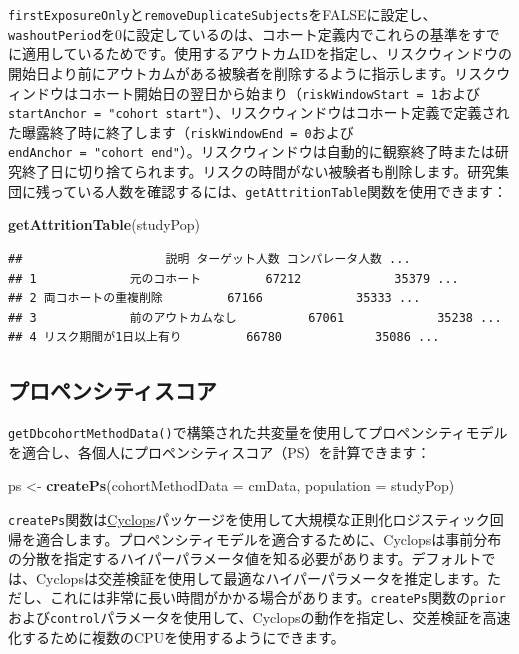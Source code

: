 \documentclass[
  11pt]{book}
\newenvironment{Shaded}{\begin{snugshade}}{\end{snugshade}}
\newcommand{\AttributeTok}[1]{\textcolor[rgb]{0.13,0.29,0.53}{#1}}
\newcommand{\FunctionTok}[1]{\textcolor[rgb]{0.13,0.29,0.53}{\textbf{#1}}}
\newcommand{\NormalTok}[1]{#1}
\newcommand{\OtherTok}[1]{\textcolor[rgb]{0.56,0.35,0.01}{#1}}
\theoremstyle{definition}
\theoremstyle{definition}
\theoremstyle{definition}
\theoremstyle{definition}
\theoremstyle{remark}
\begin{document}
\texttt{firstExposureOnly}と\texttt{removeDuplicateSubjects}をFALSEに設定し、\texttt{washoutPeriod}を0に設定しているのは、コホート定義内でこれらの基準をすでに適用しているためです。使用するアウトカムIDを指定し、リスクウィンドウの開始日より前にアウトカムがある被験者を削除するように指示します。リスクウィンドウはコホート開始日の翌日から始まり（\texttt{riskWindowStart\ =\ 1}および\texttt{startAnchor\ =\ "cohort\ start"}）、リスクウィンドウはコホート定義で定義された曝露終了時に終了します（\texttt{riskWindowEnd\ =\ 0}および\texttt{endAnchor\ =\ "cohort\ end"}）。リスクウィンドウは自動的に観察終了時または研究終了日に切り捨てられます。リスクの時間がない被験者も削除します。研究集団に残っている人数を確認するには、\texttt{getAttritionTable}関数を使用できます：

\begin{Shaded}
\begin{Highlighting}[]
\FunctionTok{getAttritionTable}\NormalTok{(studyPop)}
\end{Highlighting}
\end{Shaded}

\begin{verbatim}
##                    説明 ターゲット人数 コンパレータ人数 ...
## 1             元のコホート         67212             35379 ...
## 2 両コホートの重複削除         67166             35333 ...
## 3             前のアウトカムなし          67061             35238 ...
## 4 リスク期間が1日以上有り         66780             35086 ...
\end{verbatim}

\subsection{プロペンシティスコア}\label{ux30d7ux30edux30daux30f3ux30b7ux30c6ux30a3ux30b9ux30b3ux30a2}

\texttt{getDbcohortMethodData()}で構築された共変量を使用してプロペンシティモデルを適合し、各個人にプロペンシティスコア（PS）を計算できます：

\begin{Shaded}
\begin{Highlighting}[]
\NormalTok{ps }\OtherTok{\textless{}{-}} \FunctionTok{createPs}\NormalTok{(}\AttributeTok{cohortMethodData =}\NormalTok{ cmData, }\AttributeTok{population =}\NormalTok{ studyPop)}
\end{Highlighting}
\end{Shaded}

\texttt{createPs}関数は\href{https://ohdsi.github.io/Cyclops/}{Cyclops}パッケージを使用して大規模な正則化ロジスティック回帰を適合します。プロペンシティモデルを適合するために、Cyclopsは事前分布の分散を指定するハイパーパラメータ値を知る必要があります。デフォルトでは、Cyclopsは交差検証を使用して最適なハイパーパラメータを推定します。ただし、これには非常に長い時間がかかる場合があります。\texttt{createPs}関数の\texttt{prior}および\texttt{control}パラメータを使用して、Cyclopsの動作を指定し、交差検証を高速化するために複数のCPUを使用するようにできます。
\end{document}
